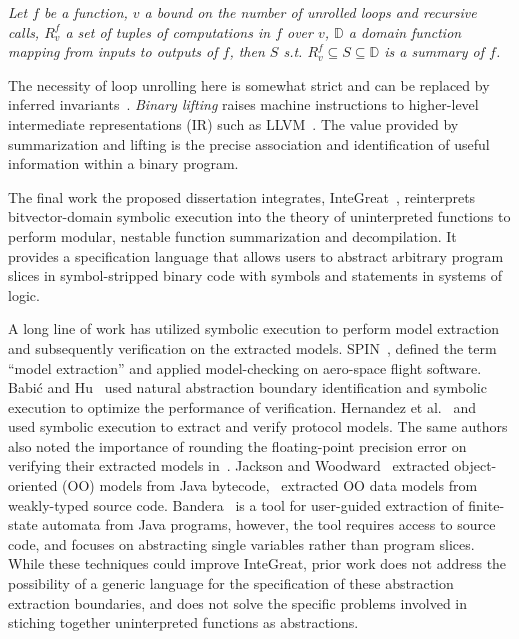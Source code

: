 \emph{Let $f$ be a function, $v$ a bound on the number of unrolled loops and recursive calls, $R_{v}^{f}$ a set of tuples of computations in $f$ over $v$, $\mathbb{D}$ a domain function mapping from inputs to outputs of $f$, then $S$ s.t. $R_{v}^{f} \subseteq S \subseteq \mathbb{D}$ is a summary of $f$.}

The necessity of loop unrolling here is somewhat strict and can be replaced by inferred invariants~\cite{furia2014loop}.
\emph{Binary lifting} raises machine instructions to higher-level intermediate representations (IR) such as LLVM~\cite{anand2013compiler,di2017rev,dinaburg2014mcsema}.
The value provided by summarization and lifting is the precise association and identification of useful information within a binary program.

The final work the proposed dissertation integrates, InteGreat~\cite{bland2023integreat}, reinterprets bitvector-domain symbolic execution into the theory of uninterpreted functions to perform modular, nestable function summarization and decompilation.
It provides a specification language that allows users to abstract arbitrary program slices in symbol-stripped binary code with symbols and statements in systems of logic.

A long line of work has utilized symbolic execution to perform model extraction and subsequently verification on the extracted models.
SPIN~\cite{spin}, defined the term ``model extraction'' and applied model-checking on aero-space flight software.
Babi\'c and Hu~\cite{babic2007structural} used natural abstraction boundary identification and symbolic execution to optimize the performance of verification.
Hernandez et al.~\cite{firmusb} and~\cite{cryto-symex} used symbolic execution to extract and verify protocol models.
The same authors also noted the importance of rounding the floating-point precision error on verifying their extracted models in~\cite{precision}.
Jackson and Woodward~\cite{lightweight-oo} extracted object-oriented (OO) models from Java bytecode,~\cite{oo-model} extracted OO data models from weakly-typed source code. 
Bandera~\cite{tool-supported-program-abstraction} is a tool for user-guided extraction of finite-state automata from Java programs, however, the tool requires access to source code, and focuses on abstracting single variables rather than program slices.
While these techniques could improve InteGreat, prior work does not address the possibility of a generic language for the specification of these abstraction extraction boundaries, and does not solve the specific problems involved in stiching together uninterpreted functions as abstractions.

